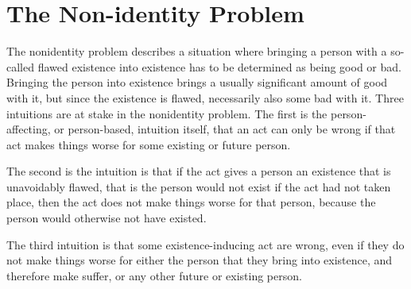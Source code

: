 \section{The Non-identity Problem}
The nonidentity problem describes a situation where bringing a person with a so-called flawed existence into existence has to be determined as being good or bad. Bringing the person into existence brings a usually significant amount of good with it, but since the existence is flawed, necessarily also some bad with it. 
Three intuitions are at stake in the nonidentity problem. The first is the person-affecting, or person-based, intuition itself, that an act can only be wrong if that act makes things worse for some existing or future person. 

The second is the intuition is that if the act gives a person an existence that is unavoidably flawed, that is the person would not exist if the act had not taken place, then the act does not make things worse for that person, because the person would otherwise not have existed.

The third intuition is that some existence-inducing act are wrong, even if they do not make things worse for either the person that they bring into existence, and therefore make suffer, or any other future or existing person. 


